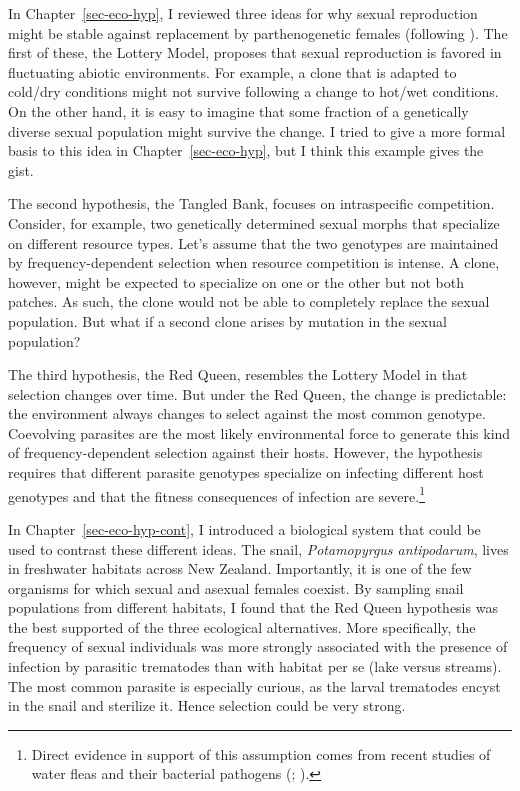 \documentclass[
  american,
  letterpaper,
]{book}
\begin{document}
In Chapter~\ref{sec-eco-hyp}, I reviewed three ideas for why sexual
reproduction might be stable against replacement by parthenogenetic
females (following ). The first of
these, the Lottery Model, proposes that sexual reproduction is favored
in fluctuating abiotic environments. For example, a clone that is
adapted to cold/dry conditions might not survive following a change to
hot/wet conditions. On the other hand, it is easy to imagine that some
fraction of a genetically diverse sexual population might survive the
change. I tried to give a more formal basis to this idea in
Chapter~\ref{sec-eco-hyp}, but I think this example gives the gist.

The second hypothesis, the Tangled Bank, focuses on intraspecific
competition. Consider, for example, two genetically determined sexual
morphs that specialize on different resource types. Let's assume that
the two genotypes are maintained by frequency-dependent selection when
resource competition is intense. A clone, however, might be expected to
specialize on one or the other but not both patches. As such, the clone
would not be able to completely replace the sexual population. But what
if a second clone arises by mutation in the sexual population?

The third hypothesis, the Red Queen, resembles the Lottery Model in that
selection changes over time. But under the Red Queen, the change is
predictable: the environment always changes to select against the most
common genotype. Coevolving parasites are the most likely environmental
force to generate this kind of frequency-dependent selection against
their hosts. However, the hypothesis requires that different parasite
genotypes specialize on infecting different host genotypes and that the
fitness consequences of infection are severe.\footnote{Direct evidence
  in support of this assumption comes from recent studies of water fleas
  and their bacterial pathogens (; ).}

In Chapter~\ref{sec-eco-hyp-cont}, I introduced a biological system that
could be used to contrast these different ideas. The snail,
\emph{Potamopyrgus antipodarum}, lives in freshwater habitats across New
Zealand. Importantly, it is one of the few organisms for which sexual
and asexual females coexist. By sampling snail populations from
different habitats, I found that the Red Queen hypothesis was the best
supported of the three ecological alternatives. More specifically, the
frequency of sexual individuals was more strongly associated with the
presence of infection by parasitic trematodes than with habitat per se
(lake versus streams). The most common parasite is especially curious,
as the larval trematodes encyst in the snail and sterilize it. Hence
selection could be very strong.
\end{document}
